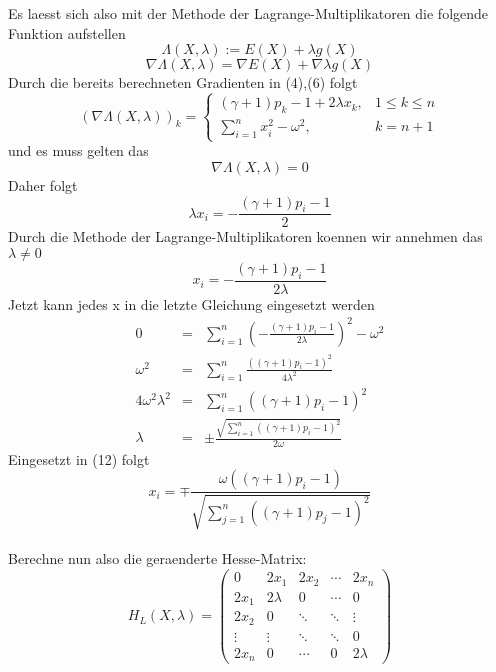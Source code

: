 \documentclass[11pt]{scrartcl}
\begin{document}
			Es laesst sich also mit der Methode der Lagrange-Multiplikatoren die folgende Funktion aufstellen
			\begin{equation}
			\Lambda(X,\lambda) := E(X)+\lambda g(X)
			\end{equation}
			\begin{equation}
			\nabla \Lambda(X,\lambda) = \nabla E(X) + \nabla \lambda g(X)
			\end{equation}
			Durch die bereits berechneten Gradienten in (4),(6) folgt
			\begin{equation}
			(\nabla \Lambda (X,\lambda))_{k}=
				\begin{cases}
					(\gamma +1)p_{k}-1+2\lambda x_{k}, & 1\leq k\leq n\\
					\sum_{i=1}^{n}x_{i}^2-\omega^2, & k = n+1
				\end{cases}
			\end{equation}
			und es muss gelten das
			\begin{equation}
			\nabla \Lambda(X,\lambda)=0
			\end{equation}
			Daher folgt
			\begin{equation}
			\lambda x_{i} = -\frac{(\gamma +1)p_{i}-1}{2}
			\end{equation}
			Durch die Methode der Lagrange-Multiplikatoren koennen wir annehmen das \(\lambda \neq 0\)
			\begin{equation}
			x_{i}= -\frac{(\gamma +1)p_{i}-1}{2\lambda}
			\end{equation}
			Jetzt kann jedes x in die letzte Gleichung eingesetzt werden
			\begin{eqnarray}
			0&=&\sum_{i=1}^{n}(-\frac{(\gamma +1)p_{i}-1}{2\lambda})^2-\omega^2\\
			\omega^2&=&\sum_{i=1}^{n}\frac{((\gamma +1)p_{i}-1)^2}{4\lambda^2}\\
			4\omega^2\lambda^2&=&\sum_{i=1}^{n}((\gamma +1)p_{i}-1)^2\\
			\lambda &=& \pm\frac{\sqrt{\sum_{i=1}^{n}((\gamma +1)p_{i}-1)^2}}{2\omega}
			\end{eqnarray}
			Eingesetzt in (12) folgt
			\begin{equation}
			x_{i}=\mp\frac{\omega((\gamma +1)p_{i}-1)}{\sqrt{\sum_{j=1}^{n}((\gamma +1)p_{j}-1)^2}}
			\end{equation}\\
			Berechne nun also die geraenderte Hesse-Matrix:
			\begin{equation}
			H_{L}(X,\lambda)=
			\left(
			\begin{array}{ccccc}
				0 & 2x_{1} & 2x_{2} & \cdots & 2x_{n} \\
				2x_{1} & 2\lambda & 0 & \cdots & 0 \\
				2x_{2} & 0 & \ddots & \ddots & \vdots \\
				\vdots & \vdots & \ddots & \ddots & 0 \\
				2x_{n} &  0 & \cdots & 0 & 2\lambda
			\end{array}
			\right)
			\end{equation}
\end{document}
